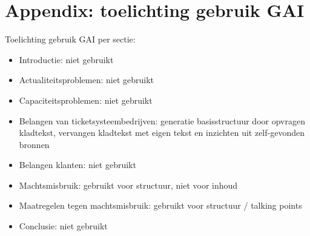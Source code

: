 
\section{Appendix: toelichting gebruik GAI}

Toelichting gebruik GAI per sectie:
\begin{itemize}
    \item Introductie: niet gebruikt
    \item Actualiteitsproblemen: niet gebruikt
    \item Capaciteitsproblemen: niet gebruikt
    \item Belangen van ticketsysteembedrijven: generatie basisstructuur door
    opvragen kladtekst, vervangen kladtekst met eigen tekst en inzichten
    uit zelf-gevonden bronnen
    \item Belangen klanten: niet gebruikt
    \item Machtsmisbruik: gebruikt voor structuur, niet voor inhoud
    \item Maatregelen tegen machtsmisbruik: gebruikt voor structuur / talking points
    \item Conclusie: niet gebruikt
\end{itemize}